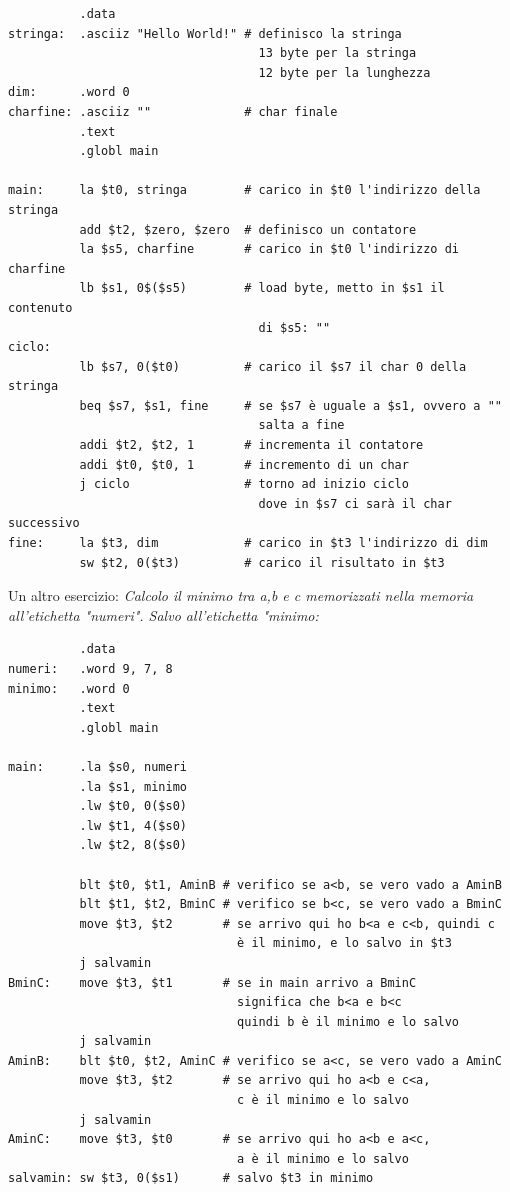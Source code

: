 \documentclass[a4paper,12pt, oneside]{book}
\begin{document}
\begin{verbatim}
          .data
stringa:  .asciiz "Hello World!" # definisco la stringa
                                   13 byte per la stringa
                                   12 byte per la lunghezza
dim:      .word 0
charfine: .asciiz ""             # char finale
          .text
          .globl main
        
main:     la $t0, stringa        # carico in $t0 l'indirizzo della stringa
          add $t2, $zero, $zero  # definisco un contatore
          la $s5, charfine       # carico in $t0 l'indirizzo di charfine
          lb $s1, 0$($s5)        # load byte, metto in $s1 il contenuto
                                   di $s5: ""
ciclo:
          lb $s7, 0($t0)         # carico il $s7 il char 0 della stringa
          beq $s7, $s1, fine     # se $s7 è uguale a $s1, ovvero a ""
                                   salta a fine
          addi $t2, $t2, 1       # incrementa il contatore
          addi $t0, $t0, 1       # incremento di un char
          j ciclo                # torno ad inizio ciclo
                                   dove in $s7 ci sarà il char successivo
fine:     la $t3, dim            # carico in $t3 l'indirizzo di dim
          sw $t2, 0($t3)         # carico il risultato in $t3
\end{verbatim}
Un altro esercizio:
\textit{Calcolo il minimo tra a,b e c memorizzati nella memoria all'etichetta "numeri". Salvo all'etichetta "minimo:}
\begin{verbatim}
          .data
numeri:   .word 9, 7, 8
minimo:   .word 0
          .text
          .globl main
          
main:     .la $s0, numeri
          .la $s1, minimo
          .lw $t0, 0($s0)
          .lw $t1, 4($s0)
          .lw $t2, 8($s0)
          
          blt $t0, $t1, AminB # verifico se a<b, se vero vado a AminB
          blt $t1, $t2, BminC # verifico se b<c, se vero vado a BminC
          move $t3, $t2       # se arrivo qui ho b<a e c<b, quindi c 
                                è il minimo, e lo salvo in $t3
          j salvamin
BminC:    move $t3, $t1       # se in main arrivo a BminC
                                significa che b<a e b<c
                                quindi b è il minimo e lo salvo
          j salvamin
AminB:    blt $t0, $t2, AminC # verifico se a<c, se vero vado a AminC
          move $t3, $t2       # se arrivo qui ho a<b e c<a,
                                c è il minimo e lo salvo
          j salvamin
AminC:    move $t3, $t0       # se arrivo qui ho a<b e a<c,
                                a è il minimo e lo salvo       
salvamin: sw $t3, 0($s1)      # salvo $t3 in minimo
\end{verbatim}
\end{document}
